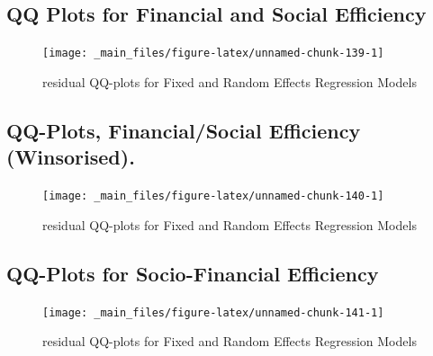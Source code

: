 \documentclass[a4paper, nobind]{templates/ociamthesis}
\begin{document}
\begin{landscape}
\end{landscape}

\begin{landscape}

\newpage

\hypertarget{qq-plots-for-financial-and-social-efficiency}{%
\subsection{QQ Plots for Financial and Social Efficiency}\label{qq-plots-for-financial-and-social-efficiency}}

\begin{figure}

{\centering \texttt{[image: \_main\_files/figure-latex/unnamed-chunk-139-1]} 

}

\caption{residual QQ-plots for Fixed and Random Effects Regression Models}\label{fig:unnamed-chunk-139}
\end{figure}

\newpage

\hypertarget{qq-plots-financialsocial-efficiency-winsorised.}{%
\subsection{QQ-Plots, Financial/Social Efficiency (Winsorised).}\label{qq-plots-financialsocial-efficiency-winsorised.}}

\begin{figure}

{\centering \texttt{[image: \_main\_files/figure-latex/unnamed-chunk-140-1]} 

}

\caption{residual QQ-plots for Fixed and Random Effects Regression Models}\label{fig:unnamed-chunk-140}
\end{figure}

\newpage

\hypertarget{qq-plots-for-socio-financial-efficiency}{%
\subsection{QQ-Plots for Socio-Financial Efficiency}\label{qq-plots-for-socio-financial-efficiency}}

\begin{figure}

{\centering \texttt{[image: \_main\_files/figure-latex/unnamed-chunk-141-1]} 

}

\caption{residual QQ-plots for Fixed and Random Effects Regression Models}\label{fig:unnamed-chunk-141}
\end{figure}

\end{landscape}
\end{document}
